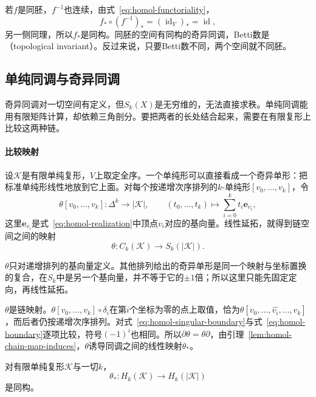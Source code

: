 若$f$是同胚，$f^{-1}$也连续，由式~\eqref{eq:homol-functoriality}，
\[
 f_*\circ(f^{-1})_*=(\operatorname{id}_Y)_*=\operatorname{id},
\]
另一侧同理，所以$f_*$是同构。同胚的空间有同构的奇异同调，Betti数是（topological invariant）。反过来说，只要Betti数不同，两个空间就不同胚。

\subsection{单纯同调与奇异同调}
\label{sec:homol-simplicial-singular}

奇异同调对一切空间有定义，但$S_k(X)$是无穷维的，无法直接求秩。单纯同调能用有限矩阵计算，却依赖三角剖分。要把两者的长处结合起来，需要在有限复形上比较这两种链。

\paragraph{比较映射}
设$\mathcal K$是有限单纯复形，$V$上取定全序。一个单纯形可以直接看成一个奇异单形：把标准单纯形线性地放到它上面。对每个按递增次序排列的$k$-单纯形$[v_0,\ldots,v_k]$，令
\begin{equation}
 \theta[v_0,\ldots,v_k]:\Delta^k\to\lvert\mathcal K\rvert,\qquad(t_0,\ldots,t_k)\mapsto\sum_{i=0}^kt_i\bm e_{v_i},
 \label{eq:homol-comparison}
\end{equation}
这里$\bm e_{v_i}$是式~\eqref{eq:homol-realization}中顶点$v_i$对应的基向量。线性延拓，就得到链空间之间的映射
\[
 \theta:C_k(\mathcal K)\to S_k(\lvert\mathcal K\rvert).
\]

$\theta$只对递增排列的基向量定义。其他排列给出的奇异单形是同一个映射与坐标置换的复合，在$S_k$中是另一个基向量，并不等于它的$\pm1$倍；所以这里只能先固定定向，再线性延拓。

$\theta$是链映射。$\theta[v_0,\ldots,v_k]\circ\delta_i$在第$i$个坐标为零的点上取值，恰为$\theta[v_0,\ldots,\widehat{v_i},\ldots,v_k]$，而后者仍按递增次序排列。对式~\eqref{eq:homol-singular-boundary}与式~\eqref{eq:homol-boundary}逐项比较，符号$(-1)^i$也相同。所以$\partial\theta=\theta\partial$，由引理~\ref{lem:homol-chain-map-induces}，$\theta$诱导同调之间的线性映射$\theta_*$。

\begin{theorem}[单纯同调与奇异同调同构]
\label{thm:homol-simplicial-singular}
对有限单纯复形$\mathcal K$与一切$k$，
\begin{equation}
 \theta_*:H_k(\mathcal K)\to H_k(\lvert\mathcal K\rvert)
 \label{eq:homol-simplicial-singular}
\end{equation}
是同构。
\end{theorem}

